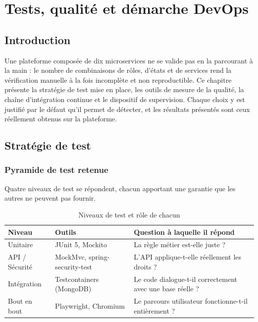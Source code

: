 %
\chapter{Tests, qualité et démarche DevOps}
\minitoc

\section*{Introduction}
Une plateforme composée de dix microservices ne se valide pas en la parcourant à la main :
le nombre de combinaisons de rôles, d'états et de services rend la vérification manuelle
à la fois incomplète et non reproductible. Ce chapitre présente la stratégie de test mise
en place, les outils de mesure de la qualité, la chaîne d'intégration continue et le
dispositif de supervision. Chaque choix y est justifié par le défaut qu'il permet de
détecter, et les résultats présentés sont ceux réellement obtenus sur la plateforme.

\section{Stratégie de test}

\subsection{Pyramide de test retenue}
Quatre niveaux de test se répondent, chacun apportant une garantie que les autres ne
peuvent pas fournir.

\begin{table}[H]\centering\renewcommand{\arraystretch}{1.3}
\begin{tabular}{|p{3.2cm}|p{5cm}|p{6cm}|}\hline
\rowcolor{gray!15}\textbf{Niveau} & \textbf{Outils} & \textbf{Question à laquelle il répond} \\ \hline
Unitaire & JUnit 5, Mockito & La règle métier est-elle juste ? \\ \hline
API / Sécurité & MockMvc, spring-security-test & L'API applique-t-elle réellement les droits ? \\ \hline
Intégration & Testcontainers (MongoDB) & Le code dialogue-t-il correctement avec une base réelle ? \\ \hline
Bout en bout & Playwright, Chromium & Le parcours utilisateur fonctionne-t-il entièrement ? \\ \hline
\end{tabular}
\caption{Niveaux de test et rôle de chacun}\label{tab:pyramide}
\end{table}

